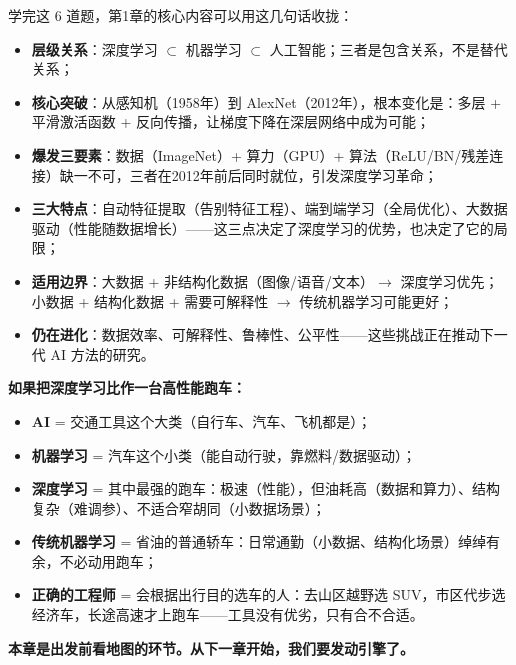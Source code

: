 \documentclass[a4paper,11pt]{ctexart}
\begin{document}
学完这 6 道题，第1章的核心内容可以用这几句话收拢：

\begin{itemize}
    \item \textbf{层级关系}：深度学习 $\subset$ 机器学习 $\subset$ 人工智能；三者是包含关系，不是替代关系；
    \item \textbf{核心突破}：从感知机（1958年）到 AlexNet（2012年），根本变化是：多层 + 平滑激活函数 + 反向传播，让梯度下降在深层网络中成为可能；
    \item \textbf{爆发三要素}：数据（ImageNet）+ 算力（GPU）+ 算法（ReLU/BN/残差连接）缺一不可，三者在2012年前后同时就位，引发深度学习革命；
    \item \textbf{三大特点}：自动特征提取（告别特征工程）、端到端学习（全局优化）、大数据驱动（性能随数据增长）——这三点决定了深度学习的优势，也决定了它的局限；
    \item \textbf{适用边界}：大数据 + 非结构化数据（图像/语音/文本）$\to$ 深度学习优先；小数据 + 结构化数据 + 需要可解释性 $\to$ 传统机器学习可能更好；
    \item \textbf{仍在进化}：数据效率、可解释性、鲁棒性、公平性——这些挑战正在推动下一代 AI 方法的研究。
\end{itemize}

\begin{metaphorbox}[给零基础读者的一句总比喻]
    \textbf{如果把深度学习比作一台高性能跑车：}
    \begin{itemize}
        \item \textbf{AI} = 交通工具这个大类（自行车、汽车、飞机都是）；
        \item \textbf{机器学习} = 汽车这个小类（能自动行驶，靠燃料/数据驱动）；
        \item \textbf{深度学习} = 其中最强的跑车：极速（性能），但油耗高（数据和算力）、结构复杂（难调参）、不适合窄胡同（小数据场景）；
        \item \textbf{传统机器学习} = 省油的普通轿车：日常通勤（小数据、结构化场景）绰绰有余，不必动用跑车；
        \item \textbf{正确的工程师} = 会根据出行目的选车的人：去山区越野选 SUV，市区代步选经济车，长途高速才上跑车——工具没有优劣，只有合不合适。
    \end{itemize}

    \textbf{本章是出发前看地图的环节。从下一章开始，我们要发动引擎了。}
\end{metaphorbox}
\end{document}
